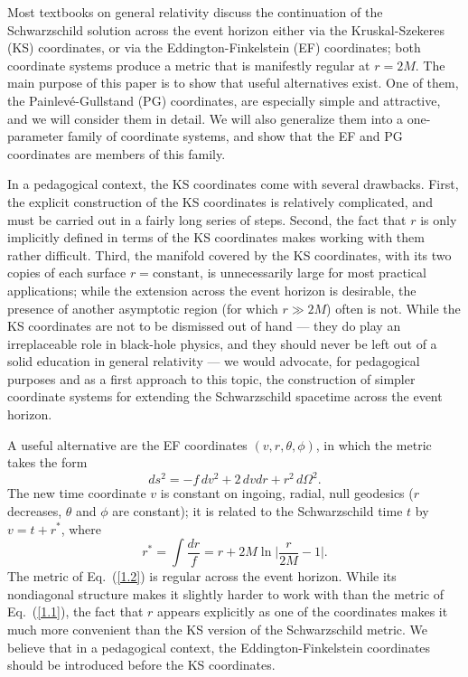 Most textbooks on general relativity \cite{Schutz,MTW,Wald} discuss 
the continuation of the Schwarzschild solution across the event
horizon either via the Kruskal-Szekeres (KS) coordinates, or via the 
Eddington-Finkelstein (EF) coordinates; both coordinate systems 
produce a metric that is manifestly regular at $r=2M$. The main
purpose of this paper is to show that useful alternatives exist. One
of them, the Painlev\'e-Gullstand (PG) coordinates, are especially
simple and attractive, and we will consider them in detail. We will
also generalize them into a one-parameter family of coordinate
systems, and show that the EF and PG coordinates are members of this
family.    

In a pedagogical context, the KS coordinates come with several
drawbacks. First, the explicit construction of the KS coordinates is
relatively complicated, and must be carried out in a fairly long
series of steps. Second, the fact that $r$ is only implicitly defined
in terms of the KS coordinates makes working with them rather
difficult. Third, the manifold covered by the KS coordinates, with its
two copies of each surface $r = \mbox{constant}$, is unnecessarily
large for most practical applications; while the extension across the
event horizon is desirable, the presence of another asymptotic region
(for which $r \gg 2M$) often is not. While the KS coordinates are not
to be dismissed out of hand --- they do play an irreplaceable role in 
black-hole physics, and they should never be left out of a solid
education in general relativity --- we would advocate, for pedagogical
purposes and as a first approach to this topic, the construction of
simpler coordinate systems for extending the Schwarzschild spacetime
across the event horizon. 

A useful alternative are the EF coordinates $(v,r,\theta,\phi)$, in
which the metric takes the form
\begin{equation}
ds^2 = -f\, dv^2 + 2\, dvdr + r^2\, d\Omega^2. 
\label{1.2}          
\end{equation}
The new time coordinate $v$ is constant on ingoing, radial, null   
geodesics ($r$ decreases, $\theta$ and $\phi$ are constant); it is
related to the Schwarzschild time $t$ by $v = t + r^*$, where 
\begin{equation}  
r^* = \int \frac{dr}{f} = r + 2M \ln \biggl| \frac{r}{2M} - 1 \biggr|.   
\label{1.3}
\end{equation}
The metric of Eq.~(\ref{1.2}) is regular across the event
horizon. While its nondiagonal structure makes it slightly harder to
work with than the metric of Eq.~(\ref{1.1}), the fact that $r$
appears explicitly as one of the coordinates makes it much more
convenient than the KS version of the Schwarzschild metric. We believe
that in a pedagogical context, the Eddington-Finkelstein coordinates
should be introduced before the KS coordinates. 

